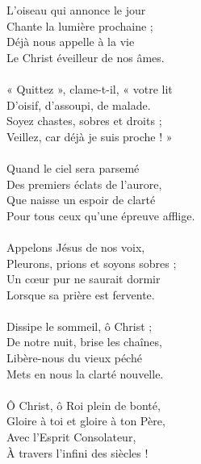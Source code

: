 L’oiseau qui annonce le jour\\
Chante la lumière prochaine ;\\
Déjà nous appelle à la vie\\
Le Christ éveilleur de nos âmes.\\
\\
« Quittez », clame-t-il, « votre lit\\
D’oisif, d’assoupi, de malade.\\
Soyez chastes, sobres et droits ;\\
Veillez, car déjà je suis proche ! »\\
\\
Quand le ciel sera parsemé\\
Des premiers éclats de l’aurore,\\
Que naisse un espoir de clarté\\
Pour tous ceux qu’une épreuve afflige.\\
\\
Appelons Jésus de nos voix,\\
Pleurons, prions et soyons sobres ;\\
Un cœur pur ne saurait dormir\\
Lorsque sa prière est fervente.\\
\\
Dissipe le sommeil, ô Christ ;\\
De notre nuit, brise les chaînes,\\
Libère-nous du vieux péché\\
Mets en nous la clarté nouvelle.\\
\\
Ô Christ, ô Roi plein de bonté,\\
Gloire à toi et gloire à ton Père,\\
Avec l’Esprit Consolateur,\\
À travers l’infini des siècles !